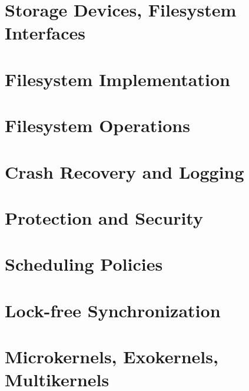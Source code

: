 \section{Storage Devices, Filesystem Interfaces}
\section{Filesystem Implementation}
\section{Filesystem Operations}
\section{Crash Recovery and Logging}
\section{Protection and Security}
\section{Scheduling Policies}
\section{Lock-free Synchronization}
\section{Microkernels, Exokernels, Multikernels}


